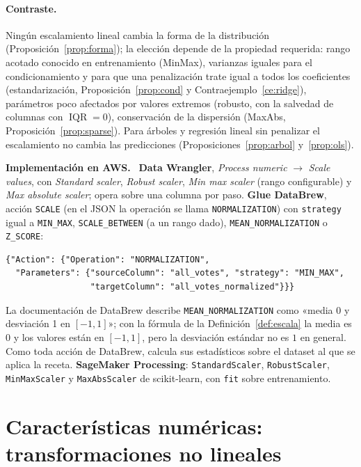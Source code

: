 \documentclass[11pt,a4paper]{article}
\theoremstyle{plain}
\theoremstyle{definition}
\theoremstyle{remark}
\newcommand{\IQR}{\operatorname{IQR}}
\newcommand{\1}{\mathbf{1}}
\newenvironment{aws}{\par\medskip\sloppy\noindent\textbf{Implementación en AWS.}\ }{\par\medskip}
\begin{document}
\paragraph{Contraste.} Ningún escalamiento lineal cambia la forma de la
distribución (Proposición~\ref{prop:forma}); la elección depende de la
propiedad requerida: rango acotado conocido en entrenamiento (MinMax),
varianzas iguales para el condicionamiento y para que una penalización
trate igual a todos los coeficientes (estandarización,
Proposición~\ref{prop:cond} y Contraejemplo~\ref{ce:ridge}), parámetros
poco afectados por valores extremos (robusto, con la salvedad de columnas
con $\IQR=0$), conservación de la dispersión (MaxAbs,
Proposición~\ref{prop:sparse}). Para árboles y regresión lineal sin
penalizar el escalamiento no cambia las predicciones
(Proposiciones~\ref{prop:arbol} y~\ref{prop:ols}).

\begin{aws}
\textbf{Data Wrangler}, \emph{Process numeric} $\to$ \emph{Scale values},
con \emph{Standard scaler}, \emph{Robust scaler}, \emph{Min max scaler}
(rango configurable) y \emph{Max absolute scaler}; opera sobre una columna
por paso. \textbf{Glue DataBrew}, acción \texttt{SCALE} (en el JSON la
operación se llama \texttt{NORMALIZATION}) con \texttt{strategy} igual a
\texttt{MIN\_MAX}, \texttt{SCALE\_BETWEEN} (a un rango dado),
\texttt{MEAN\_NORMALIZATION} o \texttt{Z\_SCORE}:
\begin{lstlisting}
{"Action": {"Operation": "NORMALIZATION",
  "Parameters": {"sourceColumn": "all_votes", "strategy": "MIN_MAX",
                 "targetColumn": "all_votes_normalized"}}}
\end{lstlisting}
La documentación de DataBrew describe \texttt{MEAN\_NORMALIZATION} como
«media 0 y desviación 1 en $[-1,1]$»; con la fórmula de la
Definición~\ref{def:escala} la media es $0$ y los valores están en
$[-1,1]$, pero la desviación estándar no es $1$ en general. Como toda
acción de DataBrew, calcula sus estadísticos sobre el dataset al que se
aplica la receta. \textbf{SageMaker Processing}: \texttt{StandardScaler},
\texttt{RobustScaler}, \texttt{MinMaxScaler} y \texttt{MaxAbsScaler} de
scikit-learn, con \texttt{fit} sobre entrenamiento.
\end{aws}

\section{Características numéricas: transformaciones no lineales}
\end{document}
